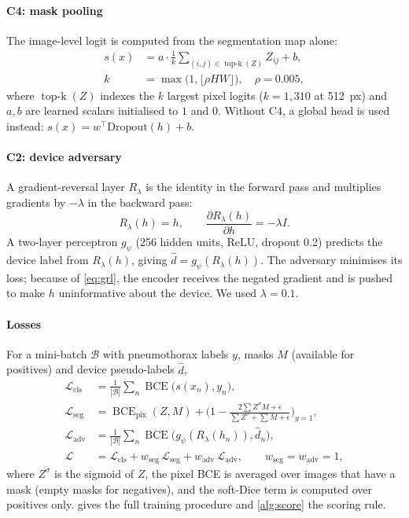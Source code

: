 \documentclass{ieeeaccess}
\DeclareMathOperator*{\topk}{top\text{-}k}
\DeclareMathOperator{\BCE}{BCE}
\begin{document}
\paragraph{C4: mask pooling}
The image-level logit is computed from the segmentation map alone:
\begin{equation}
\begin{aligned}
s(x) &= a\cdot\frac{1}{k}\sum_{(i,j)\in\topk(Z)} Z_{ij} + b,\\
k &=\max\big(1,\lfloor\rho HW\rfloor\big),\quad \rho=0.005,
\end{aligned}
\label{eq:maskpool}
\end{equation}
where $\topk(Z)$ indexes the $k$ largest pixel logits ($k=1{,}310$ at 512~px) and $a,b$ are learned scalars initialised to $1$ and $0$. Without C4, a global head is used instead: $s(x)=w^\top \mathrm{Dropout}(h)+b$.

\paragraph{C2: device adversary}
A gradient-reversal layer $R_\lambda$ \cite{ganin2015dann} is the identity in the forward pass and multiplies gradients by $-\lambda$ in the backward pass:
\begin{equation}
R_\lambda(h)=h,\qquad \frac{\partial R_\lambda(h)}{\partial h}=-\lambda I.
\label{eq:grl}
\end{equation}
A two-layer perceptron $g_\psi$ (256 hidden units, ReLU, dropout 0.2) predicts the device label from $R_\lambda(h)$, giving $\hat d = g_\psi(R_\lambda(h))$. The adversary minimises its loss; because of \cref{eq:grl}, the encoder receives the negated gradient and is pushed to make $h$ uninformative about the device. We used $\lambda=0.1$.

\paragraph{Losses}
For a mini-batch $\mathcal{B}$ with pneumothorax labels $y$, masks $M$ (available for positives) and device pseudo-labels $\hat d$,
\begin{align}
\mathcal{L}_{\text{cls}} &= \tfrac{1}{|\mathcal{B}|}\textstyle\sum_{n}\BCE\big(s(x_n),y_n\big), \label{eq:lcls}\\
\mathcal{L}_{\text{seg}} &= \BCE_{\text{pix}}(Z,M) + \Big(1-\frac{2\sum Z^\sigma M + \epsilon}{\sum Z^\sigma + \sum M + \epsilon}\Big)_{y=1}, \label{eq:lseg}\\
\mathcal{L}_{\text{adv}} &= \tfrac{1}{|\mathcal{B}|}\textstyle\sum_n\BCE\big(g_\psi(R_\lambda(h_n)),\hat d_n\big), \label{eq:ladv}\\
\mathcal{L} &= \mathcal{L}_{\text{cls}} + w_{\text{seg}}\,\mathcal{L}_{\text{seg}} + w_{\text{adv}}\,\mathcal{L}_{\text{adv}},\qquad w_{\text{seg}}=w_{\text{adv}}=1, \label{eq:ltotal}
\end{align}
where $Z^\sigma$ is the sigmoid of $Z$, the pixel BCE is averaged over images that have a mask (empty masks for negatives), and the soft-Dice term is computed over positives only.  gives the full training procedure and \cref{alg:score} the scoring rule.
\end{document}
